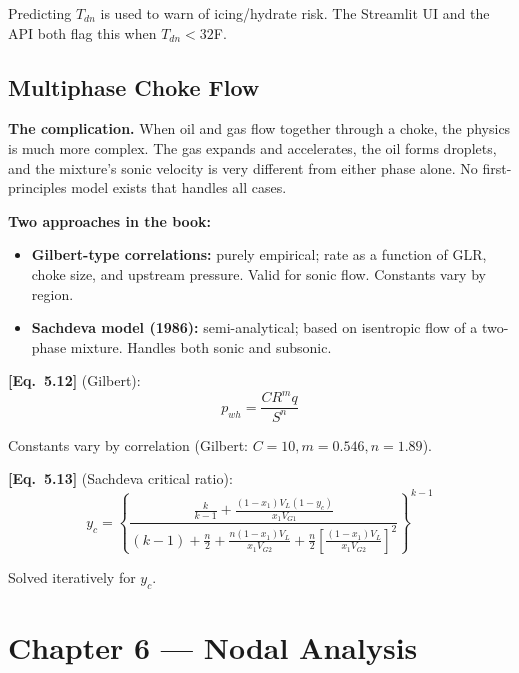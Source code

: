 \documentclass[11pt,a4paper,openany]{book}
\newcommand{\eqrefbook}[1]{\textcolor{blue!60!black}{\textbf{[Eq.~#1]}}}
\begin{document}
\begin{application}
Predicting $T_{dn}$ is used to warn of icing/hydrate risk. The
Streamlit UI and the API both flag this when $T_{dn} < 32$\textdegree F.
\end{application}

\section{Multiphase Choke Flow}

\begin{theory}
\textbf{The complication.} When oil and gas flow together through a
choke, the physics is much more complex. The gas expands and accelerates,
the oil forms droplets, and the mixture's sonic velocity is very
different from either phase alone. No first-principles model exists
that handles all cases.

\textbf{Two approaches in the book:}
\begin{itemize}
  \item \textbf{Gilbert-type correlations:} purely empirical; rate as
        a function of GLR, choke size, and upstream pressure. Valid
        for sonic flow. Constants vary by region.
  \item \textbf{Sachdeva model (1986):} semi-analytical; based on
        isentropic flow of a two-phase mixture. Handles both sonic
        and subsonic.
\end{itemize}
\end{theory}

\eqrefbook{5.12} (Gilbert):
\begin{equation}
  p_{wh} = \frac{C R^m q}{S^n}
\end{equation}

Constants vary by correlation (Gilbert: $C=10, m=0.546, n=1.89$).

\eqrefbook{5.13} (Sachdeva critical ratio):
\begin{equation}
  y_c = \left\{\frac{\frac{k}{k-1} + \frac{(1-x_1)V_L(1-y_c)}{x_1 V_{G1}}}
  {(k-1) + \frac{n}{2} + \frac{n(1-x_1)V_L}{x_1 V_{G2}} +
  \frac{n}{2}\left[\frac{(1-x_1)V_L}{x_1 V_{G2}}\right]^2}\right\}^{k-1}
\end{equation}

Solved iteratively for $y_c$.

\chapter{Chapter 6 — Nodal Analysis}
\end{document}
